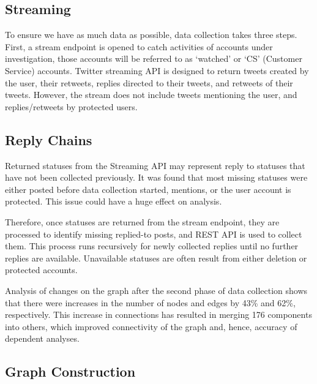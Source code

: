 \documentclass[sigconf]{acmart}
\begin{document}
\subsection{Streaming}

To ensure we have as much data as possible, data collection takes
three steps. First, a stream endpoint is opened to catch activities of
accounts under investigation, those accounts will be referred to as
`watched' or `CS' (Customer Service) accounts. Twitter streaming API
is designed to return tweets created by the user, their retweets,
replies directed to their tweets, and retweets of their
tweets. However, the stream does not include tweets mentioning the
user, and replies/retweets by protected users. 

\subsection{Reply Chains}

Returned statuses from the Streaming API may represent reply to
statuses that have not been collected previously. It was found that most
missing statuses were either posted before data collection started, mentions, 
or the user account is protected. This issue could have a huge effect on 
analysis. 

Therefore, once statuses are returned from the stream endpoint, they
are processed to identify missing replied-to posts, and REST API is
used to collect them. This process runs recursively for newly
collected replies until no further replies are available. Unavailable
statuses are often result from either deletion or protected accounts.

Analysis of changes on the graph after the second phase of data
collection shows that there were increases in the number of nodes and
edges by 43\% and 62\%, respectively. This increase in connections has
resulted in merging 176 components into others, which improved
connectivity of the graph and, hence, accuracy of dependent analyses.



\subsection{Graph Construction}
\end{document}
